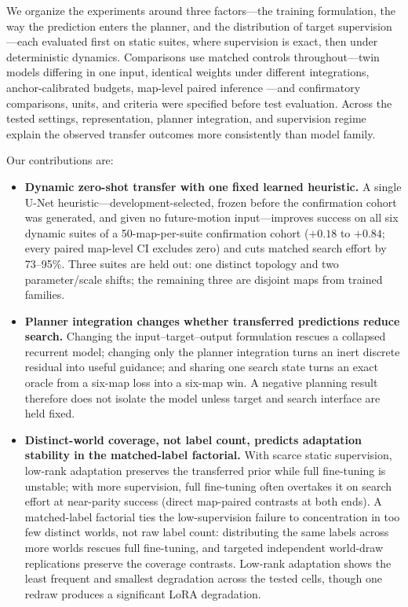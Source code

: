 \documentclass[letterpaper]{article} %
\begin{document}
We organize the experiments around three factors---the training formulation, the way the prediction enters the planner, and the distribution of target supervision---each evaluated first on static suites, where supervision is exact, then under deterministic dynamics. Comparisons use matched controls throughout---twin models differing in one input, identical weights under different integrations, anchor-calibrated budgets, map-level paired inference \citep{henderson2018matters,agarwal2021precipice,pineau2021reproducibility}---and confirmatory comparisons, units, and criteria were specified before test evaluation. Across the tested settings, representation, planner integration, and supervision regime explain the observed transfer outcomes more consistently than model family.

Our contributions are:
\begin{itemize}
    \item \textbf{Dynamic zero-shot transfer with one fixed learned heuristic.} A single U-Net heuristic---development-selected, frozen before the confirmation cohort was generated, and given no future-motion input---improves success on all six dynamic suites of a 50-map-per-suite confirmation cohort ($+0.18$ to $+0.84$; every paired map-level CI excludes zero) and cuts matched search effort by 73--95\%. Three suites are held out: one distinct topology and two parameter/scale shifts; the remaining three are disjoint maps from trained families.
    \item \textbf{Planner integration changes whether transferred predictions reduce search.} Changing the input--target--output formulation rescues a collapsed recurrent model; changing only the planner integration turns an inert discrete residual into useful guidance; and sharing one search state turns an exact oracle from a six-map loss into a six-map win. A negative planning result therefore does not isolate the model unless target and search interface are held fixed.
    \item \textbf{Distinct-world coverage, not label count, predicts adaptation stability in the matched-label factorial.} With scarce static supervision, low-rank adaptation preserves the transferred prior while full fine-tuning is unstable; with more supervision, full fine-tuning often overtakes it on search effort at near-parity success (direct map-paired contrasts at both ends). A matched-label factorial ties the low-supervision failure to concentration in too few distinct worlds, not raw label count: distributing the same labels across more worlds rescues full fine-tuning, and targeted independent world-draw replications preserve the coverage contrasts. Low-rank adaptation shows the least frequent and smallest degradation across the tested cells, though one redraw produces a significant LoRA degradation.
\end{itemize}
\end{document}
